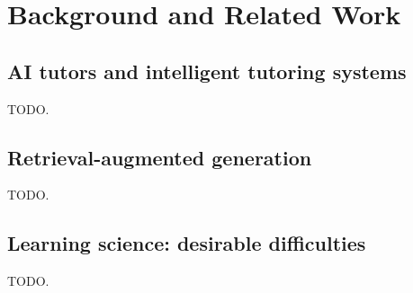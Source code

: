 \section{Background and Related Work}
\label{sec:background}


\subsection{AI tutors and intelligent tutoring systems}
TODO.

\subsection{Retrieval-augmented generation}
TODO.

\subsection{Learning science: desirable difficulties}
TODO.
